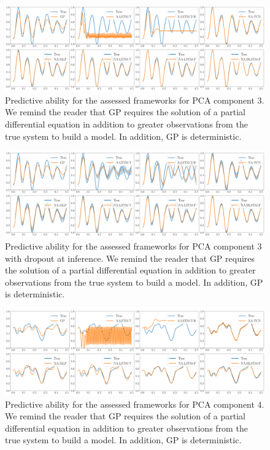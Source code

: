 \documentclass[12pt]{article}
\begin{document}
\begin{figure}[h]
    \centering
    \includegraphics[width=\textwidth]{Figure_3.png}
    \caption{Predictive ability for the assessed frameworks for PCA component 3. We remind the reader that GP requires the solution of a partial differential equation in addition to greater observations from the true system to build a model. In addition, GP is deterministic.}
    \label{Mode_3}
\end{figure}

\begin{figure}[h]
    \centering
    \includegraphics[width=\textwidth]{Figure_3_do.png}
    \caption{Predictive ability for the assessed frameworks for PCA component 3 with dropout at inference. We remind the reader that GP requires the solution of a partial differential equation in addition to greater observations from the true system to build a model. In addition, GP is deterministic.}
    \label{Mode_3_do}
\end{figure}

\begin{figure}[h]
    \centering
    \includegraphics[width=\textwidth]{Figure_4.png}
    \caption{Predictive ability for the assessed frameworks for PCA component 4. We remind the reader that GP requires the solution of a partial differential equation in addition to greater observations from the true system to build a model. In addition, GP is deterministic.}
    \label{Mode_4}
\end{figure}
\end{document}
